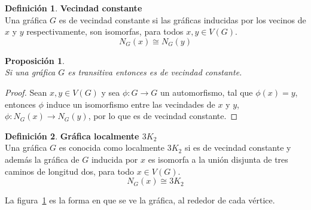 \documentclass[12pt]{book}
\newtheorem{proposition}{Proposición}
\theoremstyle{definition}
\newtheorem{definition}{Definición}
\begin{document}
\begin{definition}\textbf{Vecindad constante}\\
  Una gráfica $G$ es de vecindad constante si las gráficas inducidas por los vecinos de $x$ y $y$ respectivamente, son isomorfas, para todos $x, y \in V(G)$.
$$N_G(x)\cong N_G(y)$$
\end{definition}


\begin{proposition}\textbf{}\\
  Si una gráfica $G$ es transitiva entonces es de vecindad constante.
\end{proposition}

\begin{proof} Sean $x,y \in V(G)$ y sea $\phi: G \rightarrow G $ un
automorfismo, tal que $\phi(x)=y$, entonces $\phi$ induce un
isomorfismo entre las vecindades de $x$ y $y$, $\phi: N_G(x)
\rightarrow N_G(y) $, por lo que es de vecindad constante.
\end{proof}

\begin{definition}\textbf{Gráfica localmente $3K_2$}\\
  Una gráfica $G$ es conocida como localmente $3K_2$ si es de vecindad
  constante y además la gráfica de $G$ inducida por $x$ es isomorfa a la unión disjunta de tres caminos de longitud dos, para todo $x\in V(G)$.
$$N_G(x)\cong 3K_2$$
\end{definition}

La figura~\ref{loc} es la forma en que se ve la gráfica, al rededor de
cada vértice.

\begin{figure}
  \centering
  \caption{}\label{loc}
\end{figure}
\end{document}
